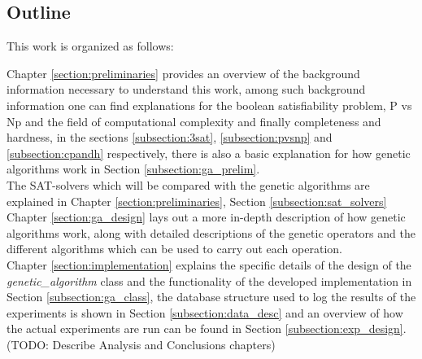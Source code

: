 \subsection {Outline}

This work is organized as follows:

Chapter \ref{section:preliminaries} provides an overview of the background information necessary to understand this work, among such background information one can find explanations for the boolean satisfiability problem, P vs Np and the field of computational complexity and finally completeness and hardness, in the sections \ref{subsection:3sat}, \ref{subsection:pvsnp} and \ref{subsection:cpandh} respectively, there is also a basic explanation for how genetic algorithms work in Section \ref{subsection:ga_prelim}.
\\The SAT-solvers which will be compared with the genetic algorithms are explained in Chapter \ref{section:preliminaries}, Section \ref{subsection:sat_solvers}
\\Chapter \ref{section:ga_design} lays out a more in-depth description of how genetic algorithms work, along with detailed descriptions of the genetic operators and the different algorithms which can be used to carry out each operation.
\\Chapter \ref{section:implementation} explains the specific details of the design of the \textit{genetic\_algorithm} class and the functionality of the developed implementation in Section \ref{subsection:ga_class}, the database structure used to log the results of the experiments is shown in Section \ref{subsection:data_desc} and an overview of how the actual experiments are run can be found in Section \ref{subsection:exp_design}.
(TODO: Describe Analysis and Conclusions chapters)